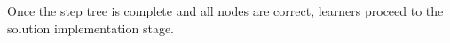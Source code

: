 Once the step tree is complete and all nodes are correct, learners proceed to the solution implementation stage.






